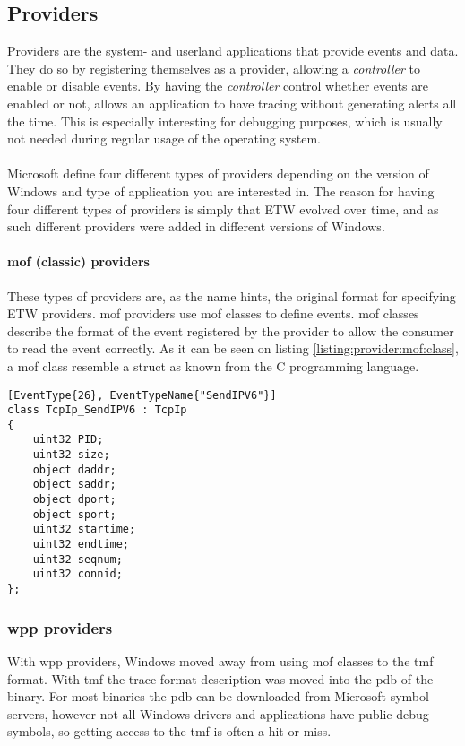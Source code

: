 \documentclass{report}
\begin{document}
\subsection{Providers}
\label{sec:etw:providers}
Providers are the system- and userland applications that provide events and data. They do so by registering themselves as a provider, allowing a \emph{controller} to enable or disable events. By having the \emph{controller} control whether events are enabled or not, allows an application to have tracing without generating alerts all the time. This is especially interesting for debugging purposes, which is usually not needed during regular usage of the operating system.
\\
\\
Microsoft define four different types of providers depending on the version of Windows and type of application you are interested in. The reason for having four different types of providers is simply that \gls{ETW} evolved over time, and as such different providers were added in different versions of Windows\cite{url:etw:provider-types}.

\paragraph{\gls{mof} (classic) providers}
These types of providers are, as the name hints, the original format for specifying \gls{ETW} providers. \gls{mof} providers use \gls{mof} classes\cite{url:etw:provider-types:mof:classes} to define events. \gls{mof} classes describe the format of the event registered by the provider to allow the consumer to read the event correctly. As it can be seen on listing \ref{listing:provider:mof:class}, a \gls{mof} class resemble a struct as known from the C programming language.

\begin{listing}[H]
\begin{verbatim}
[EventType{26}, EventTypeName{"SendIPV6"}]
class TcpIp_SendIPV6 : TcpIp
{
    uint32 PID;
    uint32 size;
    object daddr;
    object saddr;
    object dport;
    object sport;
    uint32 startime;
    uint32 endtime;
    uint32 seqnum;
    uint32 connid;
};
\end{verbatim}
\caption{\texttt{TcpIp_SendIPV6 : TcpIp} \gls{mof} class}
\label{listing:provider:mof:class}
\end{listing}

\subsubsection{\gls{wpp} providers}
With \gls{wpp} providers, Windows moved away from using \gls{mof} classes to the \gls{tmf} format. With \gls{tmf} the trace format description was moved into the \gls{pdb} of the binary. For most binaries the \gls{pdb} can be downloaded from Microsoft symbol servers\cite{url:microsoft:public-symbol-server}, however not all Windows drivers and applications have public debug symbols, so getting access to the \gls{tmf} is often a hit or miss.
\end{document}
